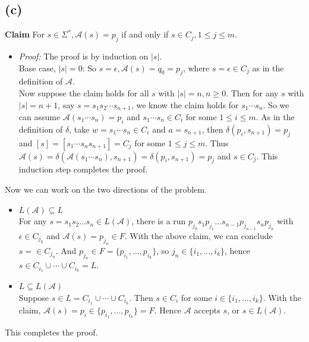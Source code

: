 \documentclass{article}
\begin{document}
        \subsection*{(c)}
            \textbf{Claim \quad} For $s \in \Sigma^*, \mathcal{A}(s) = p_j$ if and only if
            $s \in C_j, 1 \leq j \leq m$.
            \begin{itemize}
                \item \textit{Proof: \quad}
                The proof is by induction on $|s|$. \\
                Base case, $|s| = 0$: So $s = \epsilon, \mathcal{A}(s) = q_0 = p_j$,
                where $s = \epsilon \in C_j$ as in the definition of $\mathcal{A}$. \\
                Now suppose the claim holds for all $s$ with $|s| = n, n \geq 0$.
                Then for any $s$ with $|s| = n+1$, say $s = s_1 s_2 \cdots s_{n+1}$,
                we know the claim holds for $s_1 \cdots s_n$.
                So we can assume $\mathcal{A}(s_1 \cdots s_n) = p_i$ and
                $s_1 \cdots s_n \in C_i$ for some $1 \leq i \leq m$.
                As in the definition of $\delta$, take $w = s_1 \cdots s_n \in C_i$
                and $a = s_{n+1}$, then $\delta(p_i, s_{n+1}) = p_j$ and
                $[s] = [s_1 \cdots s_n s_{n+1}] = C_j$ for some $1 \leq j \leq m$.
                Thus $\mathcal{A}(s) = \delta(\mathcal{A}(s_1 \cdots s_n), s_{n+1})
                = \delta(p_i, s_{n+1}) = p_j$ and $s \in C_j$.
                This induction step completes the proof.
            \end{itemize}
            Now we can work on the two directions of the problem.
            \begin{itemize}
                \item $L(\mathcal{A}) \subseteq L$ \\
                For any $s = s_1 s_2 \dots s_n \in L(\mathcal{A})$, there is a run
                $p_{j_0} s_1 p_{j_1} \dots s_{n-1} p_{j_{n-1}} s_n p_{j_n}$
                with $\epsilon \in C_{j_0}$ and $\mathcal{A}(s) = p_{j_n} \in F$.
                With the above claim, we can conclude $s = \in C_{j_n}$.
                And $p_{j_n} \in F = \{p_{i_1}, \dots, p_{i_k}\}$,
                so $j_n \in \{i_1, \dots, i_k\}$,
                hence $s \in C_{i_1} \cup \cdots \cup C_{i_k} = L$.
                
                \item $L \subseteq L(\mathcal{A})$ \\
                Suppose $s \in L = C_{i_1} \cup \cdots \cup C_{i_k}$.
                Then $s \in C_i$ for some $i \in \{i_1, \dots, i_k\}$.
                With the claim, $\mathcal{A}(s) = p_i \in \{p_{i_1}, \dots, p_{i_k}\} = F$.
                Hence $\mathcal{A}$ accepts $s$, or $s \in L(\mathcal{A})$.
            \end{itemize}
            This completes the proof.
            
\end{document}
